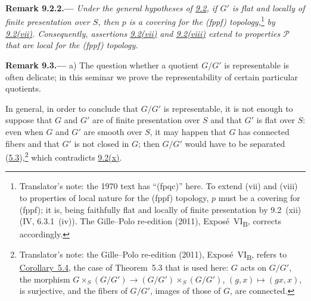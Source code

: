 \medskip
{}\label{rem:sga3-VIB-9.2.2}%
\noindent\textbf{Remark 9.2.2.---}
\emph{Under the general hypotheses of
\hyperref[prop:sga3-VIB-9.2]{9.2}, if \(G'\) is flat and
locally of finite presentation over \(S\), then \(p\) is a
covering for the \textup{(fppf)} topology,}\footnote{Translator's note: the 1970 text has
``\textup{(fpqc)}'' here. To extend \textup{(vii)} and \textup{(viii)} to properties of local nature for
the \textup{(fppf)} topology, \(p\) must be a covering for \textup{(fppf)}; it is, being faithfully flat and
locally of finite presentation by 9.2~\textup{(xii)} (IV, 6.3.1~\textup{(iv)}). The Gille--Polo
re-edition (2011), Expos\'e~VI\textsubscript{B}, corrects accordingly.}
\emph{by \hyperref[concl:sga3-VIB-9.2-vii]{9.2\textup{(vii)}}.
Consequently, assertions
\hyperref[concl:sga3-VIB-9.2-vii]{9.2\textup{(vii)}} and
\hyperref[concl:sga3-VIB-9.2-viii]{9.2\textup{(viii)}} extend
to properties \(\mathscr P\) that are local for the
\textup{(fppf)} topology.}

\medskip
{}\label{rem:sga3-VIB-9.3}%
\noindent\textbf{Remark 9.3.---}
\label{rem:sga3-VIB-9.3-a}%
\textup{a)} The question whether a quotient \(G/G'\) is
representable is often delicate; in this seminar we prove the
representability of certain particular quotients.

In general, in order to conclude that \(G/G'\) is representable,
it is not enough to suppose that \(G\) and \(G'\) are of finite
presentation over \(S\) and that \(G'\) is flat over \(S\): even
when \(G\) and \(G'\) are smooth over \(S\), it may happen that
\(G\) has connected fibers and that \(G'\) is not closed in \(G\);
then \(G/G'\) would have to be separated
\textup{(\hyperref[thm:sga3-VIB-5.3]{5.3})},\footnote{Translator's note: the Gille--Polo
re-edition (2011), Expos\'e~VI\textsubscript{B}, refers to \hyperref[cor:sga3-VIB-5.4]{Corollary~5.4}, the
case of Theorem~5.3 that is used here: \(G\) acts on \(G/G'\), the morphism
\(G\times_S(G/G')\to(G/G')\times_S(G/G')\), \((g,x)\mapsto(gx,x)\), is surjective, and the fibers of \(G/G'\),
images of those of \(G\), are connected.} which contradicts
\hyperref[concl:sga3-VIB-9.2-x]{9.2\textup{(x)}}.

